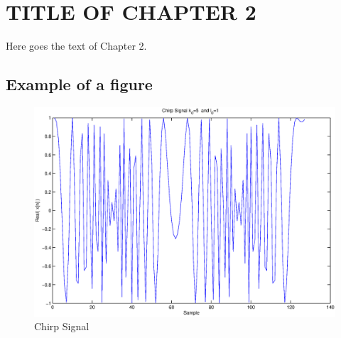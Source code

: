 ﻿%
\chapter{TITLE OF CHAPTER 2}  %

Here goes the text of Chapter 2.

\section{Example of a figure}

\begin{figure}[ht]
\begin{center}
	\includegraphics[width=5in]{figs/Chirpsignal}
	\caption{Chirp Signal}
	\label{fig:Chirpsig}
\end{center}
\end{figure}